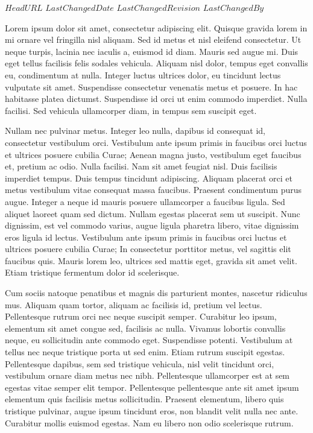 \svnidlong
{$HeadURL$}
{$LastChangedDate$}
{$LastChangedRevision$}
{$LastChangedBy$}

\begin{acknowledgments}
Lorem ipsum dolor sit amet, consectetur adipiscing elit.
Quisque gravida lorem in mi ornare vel fringilla nisl aliquam.
Sed id metus et nisl eleifend consectetur.
Ut neque turpis, lacinia nec iaculis a, euismod id diam.
Mauris sed augue mi.
Duis eget tellus facilisis felis sodales vehicula.
Aliquam nisl dolor, tempus eget convallis eu, condimentum at nulla.
Integer luctus ultrices dolor, eu tincidunt lectus vulputate sit amet.
Suspendisse consectetur venenatis metus et posuere.
In hac habitasse platea dictumst.
Suspendisse id orci ut enim commodo imperdiet.
Nulla facilisi.
Sed vehicula ullamcorper diam, in tempus sem suscipit eget.

Nullam nec pulvinar metus.
Integer leo nulla, dapibus id consequat id, consectetur vestibulum orci.
Vestibulum ante ipsum primis in faucibus orci luctus et ultrices posuere cubilia Curae; Aenean magna justo, vestibulum eget faucibus et, pretium ac odio.
Nulla facilisi.
Nam sit amet feugiat nisl.
Duis facilisis imperdiet tempus.
Duis tempus tincidunt adipiscing.
Aliquam placerat orci et metus vestibulum vitae consequat massa faucibus.
Praesent condimentum purus augue.
Integer a neque id mauris posuere ullamcorper a faucibus ligula.
Sed aliquet laoreet quam sed dictum.
Nullam egestas placerat sem ut suscipit.
Nunc dignissim, est vel commodo varius, augue ligula pharetra libero, vitae dignissim eros ligula id lectus.
Vestibulum ante ipsum primis in faucibus orci luctus et ultrices posuere cubilia Curae; In consectetur porttitor metus, vel sagittis elit faucibus quis.
Mauris lorem leo, ultrices sed mattis eget, gravida sit amet velit.
Etiam tristique fermentum dolor id scelerisque.

Cum sociis natoque penatibus et magnis dis parturient montes, nascetur ridiculus mus.
Aliquam quam tortor, aliquam ac facilisis id, pretium vel lectus.
Pellentesque rutrum orci nec neque suscipit semper.
Curabitur leo ipsum, elementum sit amet congue sed, facilisis ac nulla.
Vivamus lobortis convallis neque, eu sollicitudin ante commodo eget.
Suspendisse potenti.
Vestibulum at tellus nec neque tristique porta ut sed enim.
Etiam rutrum suscipit egestas.
Pellentesque dapibus, sem sed tristique vehicula, nisl velit tincidunt orci, vestibulum ornare diam metus nec nibh.
Pellentesque ullamcorper est at sem egestas vitae semper elit tempor.
Pellentesque pellentesque ante sit amet ipsum elementum quis facilisis metus sollicitudin.
Praesent elementum, libero quis tristique pulvinar, augue ipsum tincidunt eros, non blandit velit nulla nec ante.
Curabitur mollis euismod egestas.
Nam eu libero non odio scelerisque rutrum.


\end{acknowledgments}
